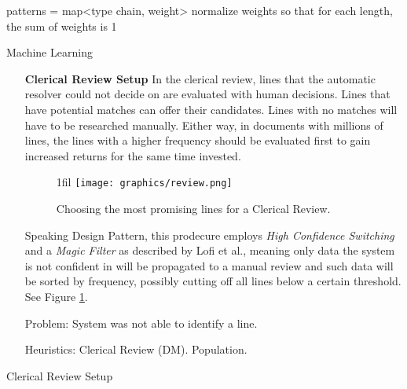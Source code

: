 \documentclass[11pt]{article}
\makeatletter
\newcommand*{\centerfloat}{
  \parindent \z@
  \leftskip \z@ \@plus 1fil \@minus \textwidth
  \rightskip\leftskip
  \parfillskip \z@skip}
\makeatother
\begin{document}
\begin{algorithm}[H]

patterns = map\textless type chain, weight\textgreater \;
normalize weights so that for each length, the sum of weights is 1\;
\caption{Machine Learning}
\end{algorithm}

\newpage

\begin{itemize}
\item[\textbf{Clerical Review Setup}] In the clerical review, lines that the automatic resolver could not decide on are evaluated with human decisions. Lines that have potential matches can offer their candidates. Lines with no matches will have to be researched manually. Either way, in documents with millions of lines, the lines with a higher frequency should be evaluated first to gain increased returns for the same time invested.

\begin{figure}[h]
  \centerfloat
    \texttt{[image: graphics/review.png]}
  \caption{Choosing the most promising lines for a Clerical Review.}
  \label{fig:review}
\end{figure}

Speaking Design Pattern, this prodecure employs \emph{High Confidence Switching} and a \emph{Magic Filter} as described by Lofi et al.\cite{lofi14}, meaning only data the system is not confident in will be propagated to a manual review and such data will be sorted by frequency, possibly cutting off all lines below a certain threshold. See Figure \ref{fig:review}.

\item[Problem:] System was not able to identify a line.
\item[Heuristics:] Clerical Review (DM). Population.
\end{itemize}

\begin{algorithm}[H]

\caption{Clerical Review Setup}
\end{algorithm}
\end{document}
